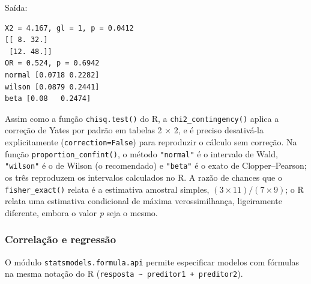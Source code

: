 \documentclass[
]{book}
\begin{document}
Saída:

\begin{verbatim}
X2 = 4.167, gl = 1, p = 0.0412
[[ 8. 32.]
 [12. 48.]]
OR = 0.524, p = 0.6942
normal [0.0718 0.2282]
wilson [0.0879 0.2441]
beta [0.08   0.2474]
\end{verbatim}

Assim como a função \texttt{chisq.test()} do R, a \texttt{chi2\_contingency()} aplica a correção de Yates por padrão em tabelas 2 × 2, e é preciso desativá-la explicitamente (\texttt{correction=False}) para reproduzir o cálculo sem correção. Na função \texttt{proportion\_confint()}, o método \texttt{"normal"} é o intervalo de Wald, \texttt{"wilson"} é o de Wilson (o recomendado) e \texttt{"beta"} é o exato de Clopper--Pearson; os três reproduzem os intervalos calculados no R. A razão de chances que o \texttt{fisher\_exact()} relata é a estimativa amostral simples, \((3 \times 11)/(7 \times 9)\); o R relata uma estimativa condicional de máxima verossimilhança, ligeiramente diferente, embora o valor \emph{p} seja o mesmo.

\subsubsection{Correlação e regressão}\label{correlauxe7uxe3o-e-regressuxe3o-1}

O módulo \texttt{statsmodels.formula.api} permite especificar modelos com fórmulas na mesma notação do R (\texttt{resposta\ \textasciitilde{}\ preditor1\ +\ preditor2}).
\end{document}
